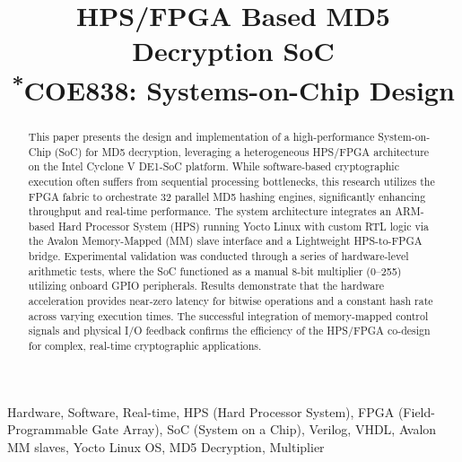 \documentclass[conference]{IEEEtran}
\begin{document}
\title{HPS/FPGA Based MD5 Decryption SoC\\
{\footnotesize \textsuperscript{*}COE838: Systems-on-Chip Design
}
}

\author{
}

\maketitle

\begin{abstract}
This paper presents the design and implementation of a high-performance System-on-Chip (SoC) for MD5 decryption, leveraging a heterogeneous HPS/FPGA architecture on the Intel Cyclone V DE1-SoC platform. While software-based cryptographic execution often suffers from sequential processing bottlenecks, this research utilizes the FPGA fabric to orchestrate 32 parallel MD5 hashing engines, significantly enhancing throughput and real-time performance. The system architecture integrates an ARM-based Hard Processor System (HPS) running Yocto Linux with custom RTL logic via the Avalon Memory-Mapped (MM) slave interface and a Lightweight HPS-to-FPGA bridge. Experimental validation was conducted through a series of hardware-level arithmetic tests, where the SoC functioned as a manual 8-bit multiplier (0--255) utilizing onboard GPIO peripherals. Results demonstrate that the hardware acceleration provides near-zero latency for bitwise operations and a constant hash rate across varying execution times. The successful integration of memory-mapped control signals and physical I/O feedback confirms the efficiency of the HPS/FPGA co-design for complex, real-time cryptographic applications.
\end{abstract}

\begin{IEEEkeywords}
Hardware, Software, Real-time, HPS (Hard Processor System), FPGA (Field-Programmable Gate Array), SoC (System on a Chip), Verilog, VHDL, Avalon MM slaves, Yocto Linux OS, MD5 Decryption, Multiplier
\end{IEEEkeywords}
\end{document}
